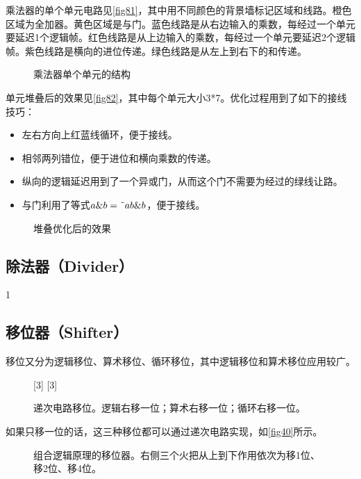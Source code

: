 乘法器的单个单元电路见\autoref{fig81}，其中用不同颜色的背景墙标记区域和线路。橙色区域为全加器。黄色区域是与门。蓝色线路是从右边输入的乘数，每经过一个单元要延迟1个逻辑帧。红色线路是从上边输入的乘数，每经过一个单元要延迟2个逻辑帧。紫色线路是横向的进位传递。绿色线路是从左上到右下的和传递。

\begin{figure}[!ht]
\centering
{}
\caption{乘法器单个单元的结构}\label{fig81}
\end{figure}

单元堆叠后的效果见\autoref{fig82}，其中每个单元大小3*7。优化过程用到了如下的接线技巧：
\begin{itemize}
	\item 左右方向上红蓝线循环，便于接线。
	\item 相邻两列错位，便于进位和横向乘数的传递。
	\item 纵向的逻辑延迟用到了一个异或门，从而这个门不需要为经过的绿线让路。
	\item 与门利用了等式$a\&b=\textrm{\~{}} ab\&b$，便于接线。
\end{itemize}

\begin{figure}[!ht]
\centering
{}
\caption{堆叠优化后的效果}\label{fig82}
\end{figure}

\subsection{除法器（Divider）}
1
\subsection{移位器（Shifter）}
移位又分为逻辑移位、算术移位、循环移位，其中逻辑移位和算术移位应用较广。

\begin{figure}[!ht]
\centering
{}%
[3]%
%
[3]%
\caption{递次电路移位。\protect{}逻辑右移一位；\protect{}算术右移一位；\protect{}循环右移一位。}\label{fig40}
\end{figure}

如果只移一位的话，这三种移位都可以通过递次电路实现，如\autoref{fig40}所示。

\begin{figure}[p]
\centering
{}


\caption{组合逻辑原理的移位器。右侧三个火把从上到下作用依次为移1位、移2位、移4位。}\label{fig35}
\end{figure}


